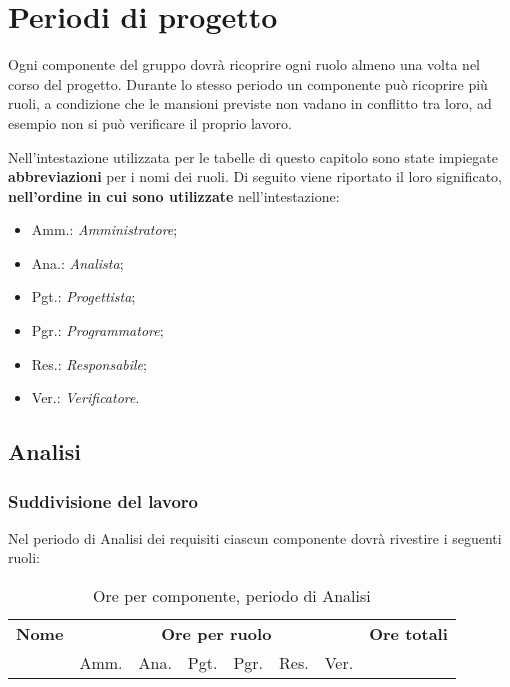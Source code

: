 


\section{Periodi di progetto}

Ogni componente del gruppo dovrà ricoprire ogni ruolo almeno una volta nel corso del progetto. Durante lo stesso periodo un componente può ricoprire più ruoli, a condizione che le mansioni previste non vadano in conflitto tra loro, ad esempio non si può verificare il proprio lavoro.

Nell'intestazione utilizzata per le tabelle di questo capitolo sono state impiegate \textbf{abbreviazioni} per i nomi dei ruoli.
Di seguito viene riportato il loro significato, \textbf{nell'ordine in cui sono utilizzate} nell'intestazione:
\begin{itemize}
	\item Amm.: \textit{Amministratore};
	\item Ana.: \textit{Analista};
	\item Pgt.: \textit{Progettista};
	\item Pgr.: \textit{Programmatore};
	\item Res.: \textit{Responsabile};
	\item Ver.: \textit{Verificatore}.
\end{itemize}


\pagebreak
\subsection{Analisi}

	
	\subsubsection{Suddivisione del lavoro}

	Nel periodo di Analisi dei requisiti ciascun componente dovrà rivestire i seguenti ruoli:
	
	\noindent
	\begin{table}[H]
	\begin{tabular}{lccccccc}
	\toprule
	    \textbf{Nome}  & \multicolumn{6}{c}{\textbf{Ore per ruolo}} & \textbf{Ore totali} \\
	     & Amm. & Ana. & Pgt. & Pgr. & Res. & Ver. & \\
	    \midrule
	    
	    \bottomrule
	\end{tabular}
	\caption{Ore per componente, periodo di Analisi}
	\end{table}

